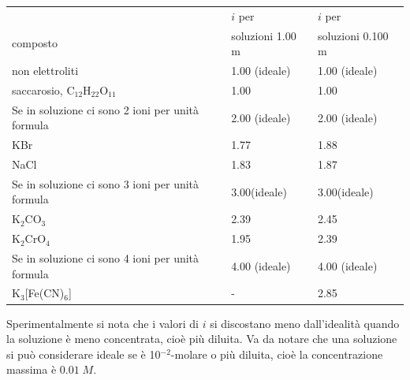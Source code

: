 \begin{center}
    \begin{tabular}{p{9cm}p{3.5cm}p{3.5cm}}
        & \hspace{1cm}$i$ per & \hspace{1cm}$i$ per\\
        composto & soluzioni 1.00 m & soluzioni 0.100 m\\[0.5 ex]
        \hline
        non elettroliti & 1.00 (ideale) & 1.00 (ideale)\\[0.5 ex]
        saccarosio, C$_{12}$H$_{22}$O$_{11}$ & 1.00 & 1.00\\[0.5 ex]
        Se in soluzione ci sono 2 ioni per unità formula & 2.00 (ideale) & 2.00 (ideale)\\[0.5 ex]
        KBr & 1.77 & 1.88\\[0.5 ex]
        NaCl & 1.83 & 1.87\\[0.5 ex]
        Se in soluzione ci sono 3 ioni per unità formula & 3.00(ideale) & 3.00(ideale)\\[0.5 ex]
        K$_2$CO$_3$ & 2.39 & 2.45 \\[0.5 ex]
        K$_2$CrO$_4$ & 1.95 & 2.39\\[0.5 ex]
        Se in soluzione ci sono 4 ioni per unità formula & 4.00 (ideale) & 4.00 (ideale)\\[0.5 ex]
        K$_3$[Fe(CN)$_6$] & - & 2.85\\[0.5 ex]
    \end{tabular}
\end{center}

Sperimentalmente si nota che i valori di $i$ si discostano meno dall'idealità quando la soluzione è meno concentrata, cioè più diluita. Va da notare che una soluzione si può considerare ideale se è 10$^{-2}$-molare o più diluita, cioè la concentrazione massima è $0.01\;M$.